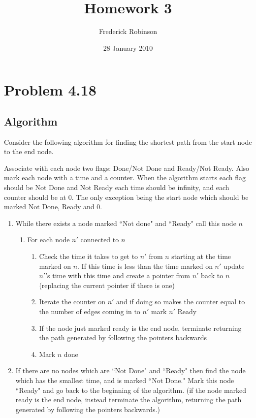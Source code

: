 \documentclass{article}
\title{Homework 3}
\author{Frederick Robinson}
\date{28 January 2010}
\begin{document}

   \maketitle



\section{Problem 4.18}

\subsection{Algorithm}
Consider the following algorithm for finding the shortest path from the start node to the end node.

Associate with each node two flags: Done/Not Done and Ready/Not Ready. Also mark each node with a time and a counter. When the algorithm starts each flag should be Not Done and Not Ready each time should be infinity, and each counter should be at 0. The only exception being the start node which should be marked Not Done, Ready and 0.
\begin{enumerate}
\item While there exists a node marked ``Not done" and ``Ready" call this node $n$
\begin{enumerate}
\item \label{check} For each node $n'$ connected to $n$ 
\begin{enumerate}
\item Check the time it takes to get to $n'$ from $n$ starting at the time marked on $n$. If this time is less than the time marked on $n'$ update $n'$'s time with this time and create a pointer from $n'$ back to $n$ (replacing the current pointer if there is one)
\item Iterate the counter on $n'$ and if doing so makes the counter equal to the number of edges coming in to $n'$ mark $n'$ Ready
\item If the node just marked ready is the end node, terminate returning the path generated by following the pointers backwards
\item Mark $n$ done
\end{enumerate}
\end{enumerate}
\item \label{catch} If there are no nodes which are ``Not Done" and ``Ready" then find the node which has the smallest time, and is marked ``Not Done." Mark this node ``Ready" and go back to the beginning of the algorithm. (if the node marked ready is the end node, instead terminate the algorithm, returning the path generated by following the pointers backwards.)
\end{enumerate}
\end{document}
